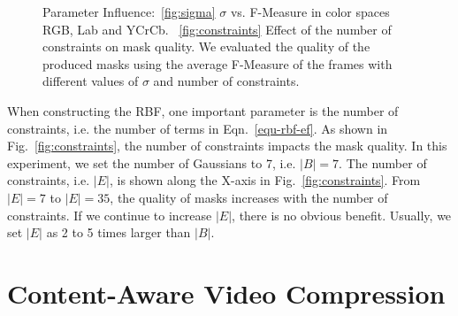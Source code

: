 \begin{figure}
	\centering
	\caption{Parameter Influence:~\ref{fig:sigma} $\sigma$ vs. F-Measure in color spaces RGB, Lab and YCrCb. ~\ref{fig:constraints} Effect of the number of constraints on mask quality. We evaluated the quality of the produced masks using the average F-Measure of the frames with different values of $\sigma$ and number of constraints.} 
	\label{fig-params}
\end{figure}

When constructing the RBF, one important parameter is the number of constraints, i.e. the number of terms in Eqn.~\ref{equ-rbf-ef}.
As shown in Fig.~\ref{fig:constraints}, the number of constraints impacts the mask quality. In this experiment, we set the number of Gaussians to 7, i.e. $|B|=7$. The number of constraints, i.e. $|E|$, is shown along the X-axis in
Fig.~\ref{fig:constraints}.
From $|E|=7$ to $|E|=35$, the quality of masks increases with the number of constraints. If we continue to increase $|E|$, there is no obvious benefit. Usually, we set $|E|$ as 2 to 5 times larger than $|B|$.

\section{Content-Aware Video Compression}
\label{os-compression}

